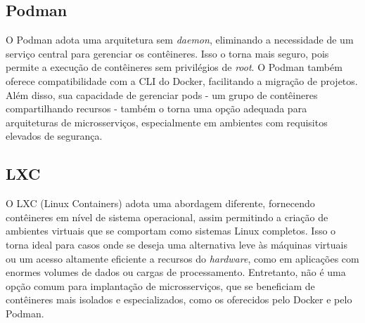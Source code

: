     
    



\subsection*{Podman}
O Podman adota uma arquitetura sem \emph{daemon}, eliminando a necessidade de um serviço central para gerenciar os contêineres. Isso o torna mais seguro, pois permite a execução de contêineres sem privilégios de \emph{root}. O Podman também oferece compatibilidade com a CLI do Docker, facilitando a migração de projetos. Além disso, sua capacidade de gerenciar pods - um grupo de contêineres compartilhando recursos - também o torna uma opção adequada para arquiteturas de microsserviços, especialmente em ambientes com requisitos elevados de segurança. \cite{podman-vs-docker}

\subsection*{LXC}
O LXC (Linux Containers) adota uma abordagem diferente, fornecendo contêineres em nível de sistema operacional, assim permitindo a criação de ambientes virtuais que se comportam como sistemas Linux completos. Isso o torna ideal para casos onde se deseja uma alternativa leve às máquinas virtuais ou um acesso altamente eficiente a recursos do \emph{hardware}, como em aplicações com enormes volumes de dados ou cargas de processamento. Entretanto, não é uma opção comum para implantação de microsserviços, que se beneficiam de contêineres mais isolados e especializados, como os oferecidos pelo Docker e pelo Podman. \cite{lxc-vs-docker}


